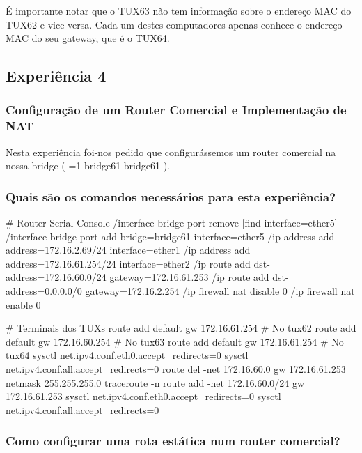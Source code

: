 \documentclass[11pt,a4paper]{article}
\newcommand{\hl}[2][1]{%
  \ifnum#1=1\relax
    \textcolor{text-hl1}{#2}%
  \else
    \textcolor{text-hl2}{#2}%
  \fi
}
\begin{document}
\begin{multicols}{2}
É importante notar que o TUX63 não tem informação sobre o endereço MAC do TUX62 e vice-versa. Cada um destes computadores apenas conhece o endereço MAC do seu gateway, que é o TUX64.

\subsection{Experiência 4}

\subsubsection{Configuração de um Router Comercial e Implementação de NAT}

Nesta experiência foi-nos pedido que configurássemos um router comercial na nossa bridge (\hl{bridge61}).

\subsubsection{Quais são os comandos necessários para esta experiência?}

\begin{bash-darktheme}
    # Router Serial Console
    /interface bridge port remove [find interface=ether5]
    /interface bridge port add bridge=bridge61 interface=ether5
    /ip address add address=172.16.2.69/24 interface=ether1
    /ip address add address=172.16.61.254/24 interface=ether2
    /ip route add dst-address=172.16.60.0/24 gateway=172.16.61.253
    /ip route add dst-address=0.0.0.0/0 gateway=172.16.2.254 
    /ip firewall nat disable 0
    /ip firewall nat enable 0

    # Terminais dos TUXs
    route add default gw 172.16.61.254 # No tux62
    route add default gw 172.16.60.254 # No tux63
    route add default gw 172.16.61.254 # No tux64    
    sysctl net.ipv4.conf.eth0.accept_redirects=0 
    sysctl net.ipv4.conf.all.accept_redirects=0 
    route del -net 172.16.60.0 gw 172.16.61.253 netmask 255.255.255.0
    traceroute -n
    route add -net 172.16.60.0/24 gw 172.16.61.253
    sysctl net.ipv4.conf.eth0.accept_redirects=0 
    sysctl net.ipv4.conf.all.accept_redirects=0 

\end{bash-darktheme}

\subsubsection{Como configurar uma rota estática num router comercial?}


\end{multicols}
\end{document}
